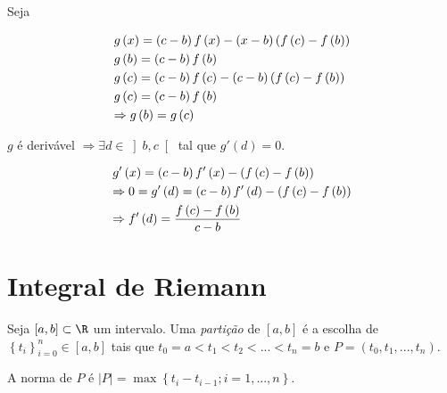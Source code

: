 \documentclass[11pt, oneside, a4paper]{gsm-l}
\begin{document}
\begin{dem}
Seja

\[
\begin{gathered}
  g\left( x \right) = \left( {c - b} \right)f\left( x \right) - \left( {x - b} \right)\left( {f\left( c \right) - f\left( b \right)} \right) \hfill \\
g\left( b \right) = \left( {c - b} \right)f\left( b \right) \hfill \\
  g\left( c \right) = \left( {c - b} \right)f\left( c \right) - \left( {c - b} \right)\left( {f\left( c \right) - f\left( b \right)} \right) \hfill \\
g\left( c \right) = \left( {c - b} \right)f\left( b \right) \hfill \\
\Rightarrow g\left( b \right) = g\left( c \right) \hfill \\
\end{gathered}
\]

    $g$ é derivável $\Rightarrow \exists d \in \left] {b,c} \right[$ tal que $g'\left( d \right) = 0$.

\[
\begin{gathered}
  g'\left( x \right) = \left( {c - b} \right)f'\left( x \right) - \left( {f\left( c \right) - f\left( b \right)} \right) \hfill \\
   \Rightarrow 0 = g'\left( d \right) = \left( {c - b} \right)f'\left( d \right) - \left( {f\left( c \right) - f\left( b \right)} \right) \hfill \\
   \Rightarrow \displaystyle f'\left( d \right) = \frac{{f\left( c \right) - f\left( b \right)}}
{{c - b}} \hfill \\
\end{gathered}
\]

\end{dem}


\section{Integral de Riemann} \label{sec05}

\begin{defi}
    Seja $\left[ {a,b} \right] \subset \R$ um intervalo. Uma \textit{partição} de $\left[ {a,b} \right]$ é a escolha de $\left\{ {t_i } \right\}_{i = 0}^n  \in \left[ {a,b} \right]$ tais que $t_0  = a < t_1  < t_2  < ... < t_n  = b$ e $P = \left( {t_0 ,t_1 ,...,t_n } \right)$.

    A norma de $P$ é $\left| P \right| = \max \left\{ {t_i  - t_{i - 1} ;i = 1,...,n} \right\}$.
\end{defi}
\end{document}
